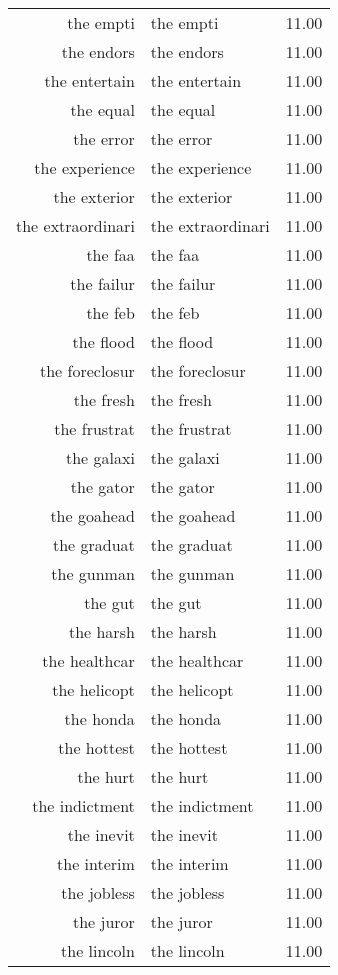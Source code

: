 \begin{table}[ht]
\begin{tabular}{rlr}
  the empti & the empti & 11.00 \\ 
  the endors & the endors & 11.00 \\ 
  the entertain & the entertain & 11.00 \\ 
  the equal & the equal & 11.00 \\ 
  the error & the error & 11.00 \\ 
  the experience & the experience & 11.00 \\ 
  the exterior & the exterior & 11.00 \\ 
  the extraordinari & the extraordinari & 11.00 \\ 
  the faa & the faa & 11.00 \\ 
  the failur & the failur & 11.00 \\ 
  the feb & the feb & 11.00 \\ 
  the flood & the flood & 11.00 \\ 
  the foreclosur & the foreclosur & 11.00 \\ 
  the fresh & the fresh & 11.00 \\ 
  the frustrat & the frustrat & 11.00 \\ 
  the galaxi & the galaxi & 11.00 \\ 
  the gator & the gator & 11.00 \\ 
  the goahead & the goahead & 11.00 \\ 
  the graduat & the graduat & 11.00 \\ 
  the gunman & the gunman & 11.00 \\ 
  the gut & the gut & 11.00 \\ 
  the harsh & the harsh & 11.00 \\ 
  the healthcar & the healthcar & 11.00 \\ 
  the helicopt & the helicopt & 11.00 \\ 
  the honda & the honda & 11.00 \\ 
  the hottest & the hottest & 11.00 \\ 
  the hurt & the hurt & 11.00 \\ 
  the indictment & the indictment & 11.00 \\ 
  the inevit & the inevit & 11.00 \\ 
  the interim & the interim & 11.00 \\ 
  the jobless & the jobless & 11.00 \\ 
  the juror & the juror & 11.00 \\ 
  the lincoln & the lincoln & 11.00 \\ 

\end{tabular}
\end{table}
